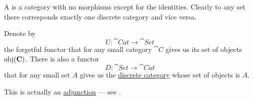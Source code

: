 \begin{definition}\label{def:discrete_category}
  A  is a category with no morphisms except for the identities. Clearly to any set there corresponds exactly one discrete category and vice versa.
\end{definition}

\begin{example}\label{ex:discrete_category_adjunction}
  Denote by
  \begin{equation*}
    U: \cat{Cat} \to \cat{Set}
  \end{equation*}
  the forgetful functor that for any small category \( \cat{C} \) gives us its set of objects \( \operatorname{obj}(\operatorname{\mathbf{C}}) \). There is also a functor
  \begin{equation*}
    D: \cat{Set} \to \cat{Cat}
  \end{equation*}
  that for any small set \( A \) gives us the \hyperref[def:discrete_category]{discrete category} whose set of objects is \( A \).

  This is actually an \hyperref[def:category_adjunction]{adjunction} --- see .
\end{example}


